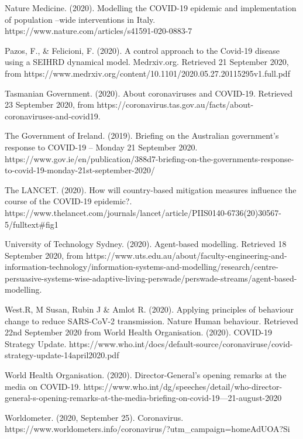 \documentclass[11pt]{article}
\begin{document}
Nature Medicine. (2020). Modelling the COVID-19 epidemic and
implementation of population --wide interventions in Italy.
https://www.nature.com/articles/s41591-020-0883-7

Pazos, F., \& Felicioni, F. (2020). A control approach to the Covid-19
disease using a SEIHRD dynamical model. Medrxiv.org. Retrieved 21
September 2020, from
https://www.medrxiv.org/content/10.1101/2020.05.27.20115295v1.full.pdf

Tasmanian Government. (2020). About coronaviruses and COVID-19.
Retrieved 23 September 2020, from
https://coronavirus.tas.gov.au/facts/about-coronaviruses-and-covid19.

The Government of Ireland. (2019). Briefing on the Australian
government's response to COVID-19 -- Monday 21 September 2020.
https://www.gov.ie/en/publication/388d7-briefing-on-the-governments-response-to-covid-19-monday-21st-september-2020/

The LANCET. (2020). How will country-based mitigation measures influence
the course of the COVID-19 epidemic?.
https://www.thelancet.com/journals/lancet/article/PIIS0140-6736(20)30567-5/fulltext\#fig1

University of Technology Sydney. (2020). Agent-based modelling.
Retrieved 18 September 2020, from
https://www.uts.edu.au/about/faculty-engineering-and-information-technology/information-systems-and-modelling/research/centre-persuasive-systems-wise-adaptive-living-perswade/perswade-streams/agent-based-modelling.

West.R, M Susan, Rubin J \& Amlot R. (2020). Applying principles of
behaviour change to reduce SARS-CoV-2 transmission. Nature Human
behaviour. Retrieved 22nd September 2020 from World Health Organisation.
(2020). COVID-19 Strategy Update.
https://www.who.int/docs/default-source/coronaviruse/covid-strategy-update-14april2020.pdf

World Health Organisation. (2020). Director-General's opening remarks at
the media on COVID-19.
https://www.who.int/dg/speeches/detail/who-director-general-s-opening-remarks-at-the-media-briefing-on-covid-19---21-august-2020

Worldometer. (2020, September 25). Coronavirus.
https://www.worldometers.info/coronavirus/?utm\_campaign=homeAdUOA?Si


    
    
    
\end{document}
